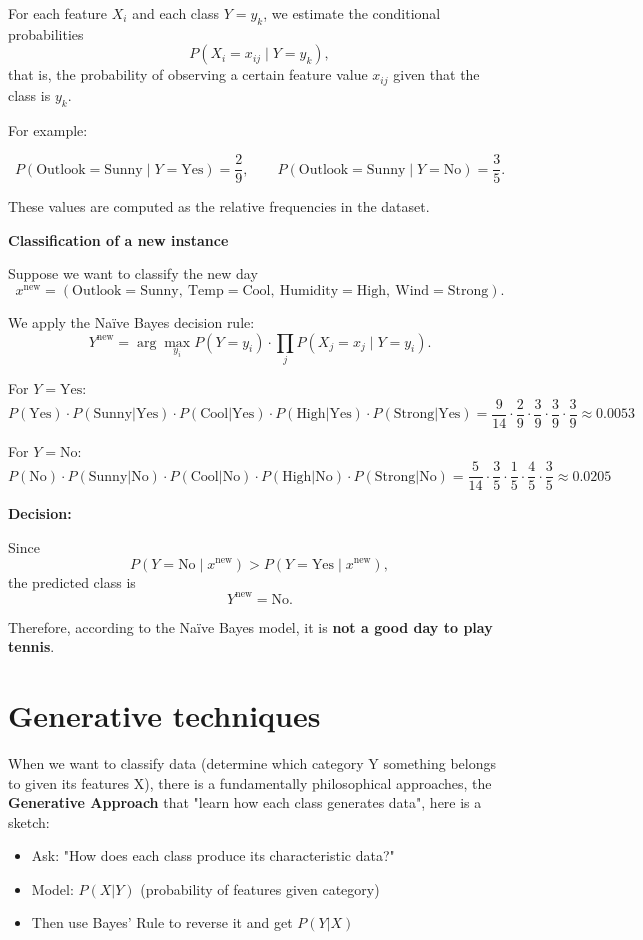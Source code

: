 {    For each feature $X_i$ and each class $Y = y_k$, we estimate the conditional probabilities
    \[
    P(X_i = x_{ij} \mid Y = y_k),
    \]
    that is, the probability of observing a certain feature value $x_{ij}$ given that the class is $y_k$.

    For example:

    \[
    P(\text{Outlook} = \text{Sunny} \mid Y = \text{Yes}) = \frac{2}{9}, \qquad
    P(\text{Outlook} = \text{Sunny} \mid Y = \text{No}) = \frac{3}{5}.
    \]

    These values are computed as the relative frequencies in the dataset.

    \medskip
    \textbf{Classification of a new instance}

    Suppose we want to classify the new day
    \[
    x^{\text{new}} = (\text{Outlook} = \text{Sunny},\ 
    \text{Temp} = \text{Cool},\ 
    \text{Humidity} = \text{High},\ 
    \text{Wind} = \text{Strong}).
    \]

    We apply the Naïve Bayes decision rule:
    \[
    Y^{\text{new}} = 
    \arg\max_{y_i} P(Y = y_i) 
    \cdot 
    \prod_j P(X_j = x_j \mid Y = y_i).
    \]

    \medskip
    For $Y = \text{Yes}$:
    \[
    P(\text{Yes}) \cdot P(\text{Sunny}|\text{Yes}) \cdot P(\text{Cool}|\text{Yes}) 
    \cdot P(\text{High}|\text{Yes}) \cdot P(\text{Strong}|\text{Yes})
    = \frac{9}{14} \cdot \frac{2}{9} \cdot \frac{3}{9} \cdot \frac{3}{9} \cdot \frac{3}{9} 
    \approx 0.0053
    \]

    For $Y = \text{No}$:
    \[
    P(\text{No}) \cdot P(\text{Sunny}|\text{No}) \cdot P(\text{Cool}|\text{No}) 
    \cdot P(\text{High}|\text{No}) \cdot P(\text{Strong}|\text{No})
    = \frac{5}{14} \cdot \frac{3}{5} \cdot \frac{1}{5} \cdot \frac{4}{5} \cdot \frac{3}{5} 
    \approx 0.0205
    \]

    \medskip
    \textbf{Decision:}

    Since
    \[
    P(Y = \text{No} \mid x^{\text{new}}) > P(Y = \text{Yes} \mid x^{\text{new}}),
    \]
    the predicted class is
    \[
    Y^{\text{new}} = \text{No}.
    \]

    \medskip
    Therefore, according to the Naïve Bayes model, it is \textbf{not a good day to play tennis}.
}

\section{Generative techniques}
When we want to classify data (determine which category Y something belongs to given its features X), there is a fundamentally philosophical approaches, the \textbf{Generative Approach} that "learn how each class generates data", here is a sketch:
\begin{itemize}
    \item Ask: "How does each class produce its characteristic data?"
    \item Model: $P(X|Y)$ (probability of features given category)
    \item Then use Bayes' Rule to reverse it and get $P(Y|X)$
\end{itemize}

